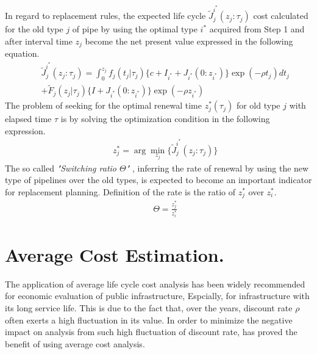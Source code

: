 \documentclass[a4paper,oneside,onecolumn,preprint,10pt,authoryear]{elsarticle}
\begin{document}
In regard to replacement rules, the expected life cycle $\tilde{J}_j^{i^\ast} (z_j:\tau_j)$ cost calculated for the old type $j$ of pipe by using the optimal type $i^*$ acquired from Step 1 and after interval time $z_j$ become the net present value expressed in the following equation.
\begin{eqnarray}
&& \tilde{J}_j^{i^\ast}(z_j:\tau_j)
 =\int_0^{z_j} f_j(t_j|\tau_j)\{c+I_{i^\ast}+J_{i^\ast}(0:z_{i^\ast})\} \exp(-\rho t_j)dt_j  \nonumber \\
&& + \tilde{F}_j(z_j|\tau_j)\{I+J_{i^\ast}(0:z_{i^\ast})\} \exp(-\rho z_{i^\ast})  \label{han2}
\end{eqnarray}
The problem of seeking for the optimal renewal time $z_j^\ast(\tau_j)$ for old type $j$ with elapsed time $\tau$ is by solving the optimization condition in the following expression.
\begin{eqnarray}
&& z_j^\ast=\arg \min_{z_j} \{\tilde{J}_j^{i^\ast}(z_j:\tau_j)\} \label{sa}
\end{eqnarray}
The so called \textit{"Switching ratio $\Theta$" }, inferring the rate of renewal by using the new type of pipelines over the old types, is expected to become an important indicator for replacement planning. Definition of the rate is the ratio of $z^*_j$ over $z^*_i$.
\begin{eqnarray}
&& \Theta = \frac{z^*_j}{z^*_i} \label{swratio}
\end{eqnarray}
\section{Average Cost Estimation.}
The application of average life cycle cost analysis has been widely recommended for economic evaluation of public infrastructure, Espcially, for infrastructure with its long service life. This is due to the fact that, over the years, discount rate $\rho$ often exerts a high fluctuation in its value. In order to minimize the negative impact on analysis from such high fluctuation of discount rate, \cite{kobaevarg} has proved the benefit of using average cost analysis.
\end{document}
